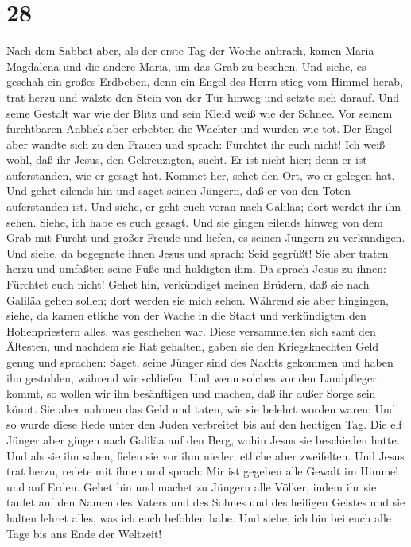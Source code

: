 \hypertarget{section-27}{%
\section{28}\label{section-27}}

 Nach dem Sabbat aber, als der erste Tag der Woche
anbrach, kamen Maria Magdalena und die andere Maria, um das Grab zu
besehen.  Und siehe, es geschah ein großes Erdbeben, denn
ein Engel des Herrn stieg vom Himmel herab, trat herzu und wälzte den
Stein von der Tür hinweg und setzte sich darauf.  Und
seine Gestalt war wie der Blitz und sein Kleid weiß wie der Schnee.
 Vor seinem furchtbaren Anblick aber erbebten die Wächter
und wurden wie tot.  Der Engel aber wandte sich zu den
Frauen und sprach: Fürchtet ihr euch nicht! Ich weiß wohl, daß ihr
Jesus, den Gekreuzigten, sucht.  Er ist nicht hier; denn
er ist auferstanden, wie er gesagt hat. Kommet her, sehet den Ort, wo er
gelegen hat.  Und gehet eilends hin und saget seinen
Jüngern, daß er von den Toten auferstanden ist. Und siehe, er geht euch
voran nach Galiläa; dort werdet ihr ihn sehen. Siehe, ich habe es euch
gesagt.  Und sie gingen eilends hinweg von dem Grab mit
Furcht und großer Freude und liefen, es seinen Jüngern zu verkündigen.
 Und siehe, da begegnete ihnen Jesus und sprach: Seid
gegrüßt! Sie aber traten herzu und umfaßten seine Füße und huldigten
ihm.  Da sprach Jesus zu ihnen: Fürchtet euch nicht!
Gehet hin, verkündiget meinen Brüdern, daß sie nach Galiläa gehen
sollen; dort werden sie mich sehen.  Während sie aber
hingingen, siehe, da kamen etliche von der Wache in die Stadt und
verkündigten den Hohenpriestern alles, was geschehen war.
 Diese versammelten sich samt den Ältesten, und nachdem
sie Rat gehalten, gaben sie den Kriegsknechten Geld genug
 und sprachen: Saget, seine Jünger sind des Nachts
gekommen und haben ihn gestohlen, während wir schliefen. 
Und wenn solches vor den Landpfleger kommt, so wollen wir ihn
besänftigen und machen, daß ihr außer Sorge sein könnt. 
Sie aber nahmen das Geld und taten, wie sie belehrt worden waren: Und so
wurde diese Rede unter den Juden verbreitet bis auf den heutigen Tag.
 Die elf Jünger aber gingen nach Galiläa auf den Berg,
wohin Jesus sie beschieden hatte.  Und als sie ihn sahen,
fielen sie vor ihm nieder; etliche aber zweifelten.  Und
Jesus trat herzu, redete mit ihnen und sprach: Mir ist gegeben alle
Gewalt im Himmel und auf Erden.  Gehet hin und machet zu
Jüngern alle Völker, indem ihr sie taufet auf den Namen des Vaters und
des Sohnes und des heiligen Geistes  und sie halten
lehret alles, was ich euch befohlen habe. Und siehe, ich bin bei euch
alle Tage bis ans Ende der Weltzeit!
